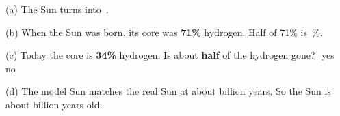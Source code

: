 \documentclass[12pt,a4paper]{article}
\newif\iffr
\newcommand{\fr}[1]{\unskip\iffr\par\nobreak\vspace{1pt}\noindent{\small\itshape\color{black!60}#1}\par\fi}
\newcommand{\choice}[1]{\tickbox\,\,#1}
\begin{document}
\vspace{10pt}
\noindent (a) The Sun turns \blank[3.0cm] into \blank[3.0cm]\,.
\fr{(a) Le Soleil transforme \ldots\ en \ldots\ (\'ecris les mots en
anglais).}

\vspace{10pt}
\noindent (b) When the Sun was born, its core was \textbf{71\%} hydrogen.
Half of 71\% is \blank[2.0cm]\,\%.
\fr{(b) \`A la naissance du Soleil, son c\oe{}ur contenait 71\,\%
d'hydrog\`ene. Combien fait la moiti\'e de 71\,\%~?}

\vspace{10pt}
\noindent (c) Today the core is \textbf{34\%} hydrogen. Is about
\textbf{half} of the hydrogen gone? \hfill \choice{yes} \quad\; \choice{no}
\fr{(c) Aujourd'hui, le c\oe{}ur contient 34\,\% d'hydrog\`ene. Est-ce
qu'environ la moiti\'e de l'hydrog\`ene a disparu~?}

\vspace{10pt}
\noindent (d) The model Sun matches the real Sun at about \blank[1.6cm]
billion years. So the Sun is about \blank[1.6cm] billion years old.
\fr{(d) Le Soleil mod\`ele ressemble au vrai Soleil vers \ldots\ milliards
d'ann\'ees (\eng{billion years}). Le Soleil a donc environ \ldots\ milliards
d'ann\'ees.}
\end{document}
